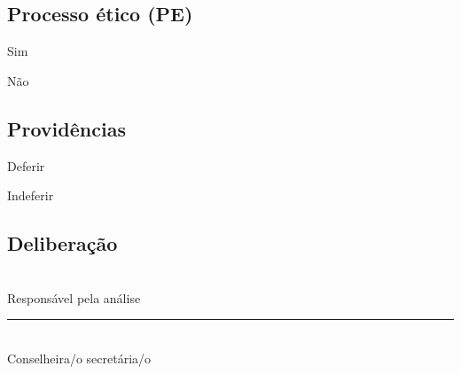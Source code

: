 \documentclass[openright, oneside, a4paper, article, brazil]{abntex2}
\begin{document}
\begin{framed}\noindent
	\begin{minipage}{0.5\linewidth}{%
			\subsection{Processo ético (PE)}
			\begin{minipage}{\boxlarg}
			\end{minipage}%
			\begin{minipage}{\linewidth-\boxlarg}
				Sim
			\end{minipage}
			\begin{minipage}{\boxlarg}
			\end{minipage}%
			\begin{minipage}{\linewidth-\boxlarg}
				Não
			\end{minipage}
		}%
	\end{minipage}%
	\begin{minipage}{0.5\linewidth}{%
		\subsection{Providências}
		\begin{minipage}{\boxlarg}
		\end{minipage}%
		\begin{minipage}{\linewidth-\boxlarg}
			Deferir
		\end{minipage}
		\begin{minipage}{\boxlarg}
		\end{minipage}%
		\begin{minipage}{\linewidth-\boxlarg}
			Indeferir
		\end{minipage}
	}%
	\end{minipage}
\end{framed}

\subsection{Deliberação}


\begin{flushright}
	\\
	\footnotesize Responsável pela análise
\end{flushright}
\vspace*{4\baselineskip}
\begin{center}
	\rule{24em}{0.4pt}\\
	\footnotesize Conselheira/o secretária/o
\end{center}
\end{document}
